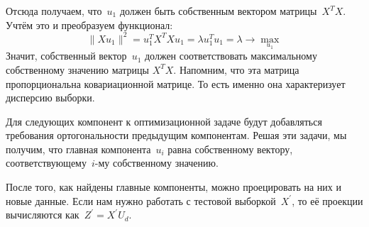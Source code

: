 \documentclass[12pt,fleqn]{article}
\begin{document}
Отсюда получаем, что~$u_1$ должен быть собственным вектором матрицы~$X^T X$.
Учтём это и преобразуем функционал:
\[
    \| X u_1 \|^2
    =
    u_1^T X^T X u_1
    =
    \lambda u_1^T u_1
    =
    \lambda
    \to
    \max_{u_1}
\]
Значит, собственный вектор~$u_1$ должен соответствовать максимальному
собственному значению матрицы $X^TX.$ Напомним, что эта матрица пропорциональна ковариационной матрице. То есть именно она характеризует дисперсию выборки. 

Для следующих компонент к оптимизационной задаче будут добавляться требования
ортогональности предыдущим компонентам.
Решая эти задачи, мы получим, что главная компонента~$u_i$
равна собственному вектору, соответствующему~$i$-му собственному значению.

После того, как найдены главные компоненты, можно проецировать на них и новые данные.
Если нам нужно работать с тестовой выборкой~$X^\prime$, то её проекции вычисляются как~$Z^\prime = X^\prime U_d$.
\end{document}
